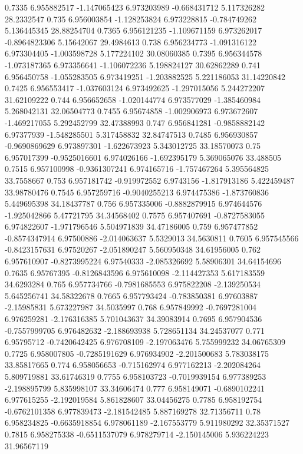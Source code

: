 {0.7335 6.955882517 -1.147065423 6.973203989 -0.668431712 5.117326282 28.2332547
0.735 6.956003854 -1.128253824 6.973228815 -0.784749262 5.136445345 28.88254704
0.7365 6.956121235 -1.109671159 6.973262017 -0.8964823306 5.15642067 29.4984613
0.738 6.956234773 -1.091316122 6.973304405 -1.003598728 5.177224102 30.08060385
0.7395 6.956344578 -1.073187365 6.973356641 -1.106072236 5.198824127 30.62862289
0.741 6.956450758 -1.055283505 6.973419251 -1.203882525 5.221186053 31.14220842
0.7425 6.956553417 -1.037603124 6.973492625 -1.297015056 5.244272207 31.62109222
0.744 6.956652658 -1.020144774 6.973577029 -1.385460984 5.268042131 32.06504773
0.7455 6.95674858 -1.002906973 6.973672607 -1.469217055 5.292452799 32.47388993
0.747 6.956841281 -0.9858882142 6.97377939 -1.548285501 5.317458832 32.84747513
0.7485 6.956930857 -0.9690869629 6.973897301 -1.622673923 5.343012725 33.18570073
0.75 6.957017399 -0.9525016601 6.974026166 -1.692395179 5.369065076 33.488505
0.7515 6.957100998 -0.9361307241 6.974165716 -1.757467264 5.395564825 33.7558667
0.753 6.957181742 -0.919972552 6.9743156 -1.817913186 5.422459487 33.98780476
0.7545 6.957259716 -0.9040255213 6.974475386 -1.873760836 5.449695398 34.18437787
0.756 6.957335006 -0.8882879915 6.974644576 -1.925042866 5.47721795 34.34568402
0.7575 6.957407691 -0.8727583055 6.974822607 -1.971796546 5.504971839 34.47186005
0.759 6.957477852 -0.8574347914 6.97500886 -2.014063637 5.5329013 34.5630811
0.7605 6.957545566 -0.8423157631 6.97520267 -2.051890247 5.560950348 34.61956005
0.762 6.957610907 -0.8273995224 6.97540333 -2.085326692 5.58906301 34.64154696
0.7635 6.95767395 -0.8126843596 6.975610098 -2.114427353 5.617183559 34.6293284
0.765 6.957734766 -0.7981685553 6.975822208 -2.139250534 5.645256741 34.58322678
0.7665 6.957793424 -0.783850381 6.97603887 -2.15985831 5.673227987 34.5035997
0.768 6.957849992 -0.7697281004 6.976259281 -2.176316385 5.701043637 34.39083914
0.7695 6.957904536 -0.7557999705 6.976482632 -2.188693938 5.728651134 34.24537077
0.771 6.95795712 -0.7420642425 6.976708109 -2.197063476 5.755999232 34.06765309
0.7725 6.958007805 -0.7285191629 6.976934902 -2.201500683 5.783038175 33.85817665
0.774 6.958056653 -0.715162974 6.977162213 -2.202084264 5.809719881 33.61746319
0.7755 6.958103723 -0.7019939154 6.977389253 -2.198895799 5.835998107 33.34606474
0.777 6.958149071 -0.6890102241 6.977615255 -2.192019584 5.861828607 33.04456275
0.7785 6.958192754 -0.6762101358 6.977839473 -2.181542485 5.887169278 32.71356711
0.78 6.958234825 -0.6635918854 6.978061189 -2.167553779 5.911980292 32.35371527
0.7815 6.958275338 -0.6511537079 6.978279714 -2.150145006 5.936224223 31.96567119
}
